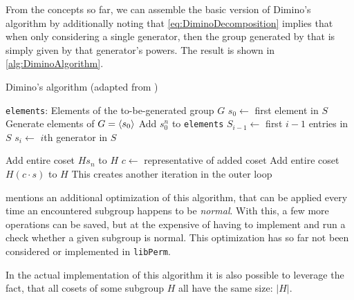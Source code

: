 \documentclass[parskip=half]{scrartcl}
\newcommand{\code}[1]{\texttt{#1}}
\begin{document}
	From the concepts so far, we can assemble the basic version of Dimino's algorithm by additionally noting that \cref{eq:DiminoDecomposition}
	implies that when only considering a single generator, then the group generated by that is simply given by that generator's
	powers.\supercite{Butler1991a} The result is shown in \cref{alg:DiminoAlgorithm}.

	\begin{algorithm}[!htb]
		\caption{Dimino's algorithm (adapted from \textcite{Butler1991a})}
		\label{alg:DiminoAlgorithm}

		\begin{algorithmic}[1]
				\State \code{elements}: Elements of the to-be-generated group $G$
				\State $s_0 \gets $ first element in $S$
				\Comment Generate elements of $G = \braket{s_0}$
					\State Add $s_0^n$ to \code{elements}
				\EndFor
				\For{$i \in [1, $ size of $S) \wedge i \in \mathbb{N}$}
					\State $S_{i-1} \gets$ first $i - 1$ entries in $S$
					\State $s_i \gets$ $i$th generator in $S$
					\State \Call{extendGroup}{\code{elements}, $S_{i-1}$, $s_i$}
				\EndFor
			\EndFunction

					\State \Return
				\EndIf
				\State Add entire coset $H s_n$ to $H$
					\State $c \gets $ representative of added coset
							\State Add entire coset $H (c \cdot s)$ to $H$
							\Comment This creates another iteration in the outer loop
						\EndIf
					\EndFor
				\EndFor
			\EndFunction
		\end{algorithmic}
	\end{algorithm}

	\textcite{Butler1991a} mentions an additional optimization of this algorithm, that can be applied every time an encountered subgroup happens to be
	\emph{normal}. With this, a few more operations can be saved, but at the expensive of having to implement and run a check whether a given subgroup
	is normal. This optimization has so far not been considered or implemented in \code{libPerm}.

	In the actual implementation of this algorithm it is also possible to leverage the fact, that all cosets of some subgroup $H$ all have the same
	size: $|H|$.
\end{document}
